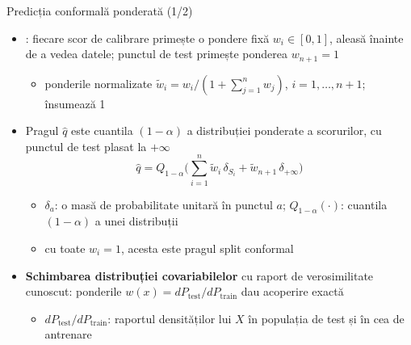 \begin{frame}{Predicția conformală ponderată (1/2)}
\itemsize{\small}
\begin{itemize}
    \item {}: fiecare scor de calibrare primește o pondere fixă $w_i \in [0, 1]$, aleasă înainte de a vedea datele; punctul de test primește ponderea $w_{n+1} = 1$
    \begin{itemize}
        \item ponderile normalizate $\tilde w_i = w_i/(1 + \sum_{j=1}^n w_j)$, $i = 1, \dots, n + 1$; însumează 1
    \end{itemize}
    \item Pragul $\hat q$ este cuantila $(1 - \alpha)$ a distribuției ponderate a scorurilor, cu punctul de test plasat la $+\infty$ \[ \hat q = Q_{1-\alpha}\Big(\sum_{i=1}^n \tilde w_i\,\delta_{S_i} + \tilde w_{n+1}\,\delta_{+\infty}\Big) \]
    \begin{itemize}
        \item $\delta_a$: o masă de probabilitate unitară în punctul $a$; $Q_{1-\alpha}(\cdot)$: cuantila $(1 - \alpha)$ a unei distribuții
        \item cu toate $w_i = 1$, acesta este pragul split conformal
    \end{itemize}
    \item \textbf{Schimbarea distribuției covariabilelor} cu raport de verosimilitate cunoscut: ponderile $w(x) = dP_{\mathrm{test}}/dP_{\mathrm{train}}$ dau acoperire exactă 
    \begin{itemize}
        \item $dP_{\mathrm{test}}/dP_{\mathrm{train}}$: raportul densităților lui $X$ în populația de test și în cea de antrenare
    \end{itemize}
\end{itemize}
\end{frame}

